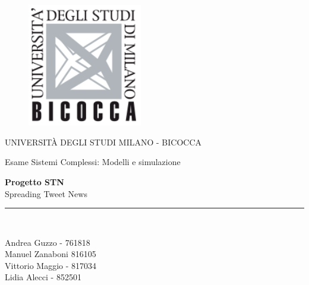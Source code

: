 \documentclass[11pt]{article}
\begin{document}
\begin{titlepage}

\begin{center}
\vspace*{-1in}
\begin{figure}[htb]
\begin{center}
\includegraphics[width=5cm]{Resources/BicoccaLogo.png}
\end{center}
\end{figure}
UNIVERSITÀ DEGLI STUDI MILANO - BICOCCA \\
\vspace*{0.4in}
\begin{large}
Esame Sistemi Complessi: Modelli e simulazione\\
\end{large}
\vspace*{0.2in}
\begin{Large}
\textbf{Progetto STN} \\
\vspace*{0.15in}
Spreading Tweet News \\
\end{Large}
\vspace*{0.3in}

\vspace*{0.3in}
\rule{80mm}{0.1mm}\\
\vspace*{0.1in}
\begin{large}

Andrea Guzzo - 761818\\
Manuel Zanaboni 816105\\
Vittorio Maggio - 817034\\
Lidia Alecci - 852501


\end{large}
\end{center}
\end{titlepage}
\end{document}
